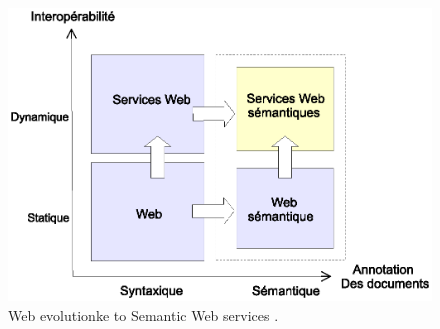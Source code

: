\begin{figure}[h]
    \centering
    \includegraphics[width=1\textwidth]{figs/3w_to_sws.eps}
    \caption{Web evolutionke to Semantic Web services \cite{fensel2002semantic}.}
    \label{fig:3w_to_sws}
\end{figure}
